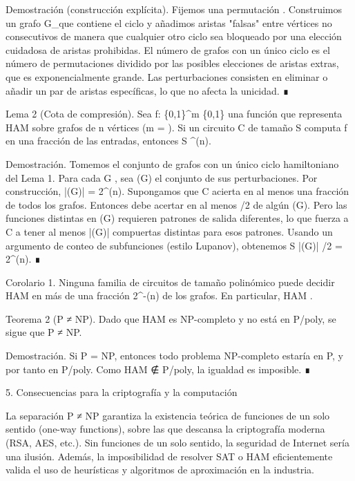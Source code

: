 \documentclass[12pt,a4paper]{book}
\begin{document}
Demostración (construcción explícita). Fijemos una permutación \sigma. Construimos un grafo G_\sigma que contiene el ciclo \sigma y añadimos aristas "falsas" entre vértices no consecutivos de manera que cualquier otro ciclo sea bloqueado por una elección cuidadosa de aristas prohibidas. El número de grafos con un único ciclo es el número de permutaciones dividido por las posibles elecciones de aristas extras, que es exponencialmente grande. Las perturbaciones consisten en eliminar o añadir un par de aristas específicas, lo que no afecta la unicidad. ∎

Lema 2 (Cota de compresión). Sea f: \{0,1\}^m \to \{0,1\} una función que representa HAM sobre grafos de n vértices (m = ). Si un circuito C de tamaño S computa f en una fracción \delta de las entradas, entonces S \ge \delta {}^{\Omega(n)}.

Demostración. Tomemos el conjunto  de grafos con un único ciclo hamiltoniano del Lema 1. Para cada G \in {}, sea (G) el conjunto de sus perturbaciones. Por construcción, |(G)| = 2^{\Omega(n)}. Supongamos que C acierta en al menos una fracción \delta de todos los grafos. Entonces debe acertar en al menos \delta/2 de algún (G). Pero las funciones distintas en (G) requieren patrones de salida diferentes, lo que fuerza a C a tener al menos |(G)| compuertas distintas para esos patrones. Usando un argumento de conteo de subfunciones (estilo Lupanov), obtenemos S \ge |(G)| \cdot \delta/2 = 2^{\Omega(n)}. ∎

Corolario 1. Ninguna familia de circuitos de tamaño polinómico puede decidir HAM en más de una fracción 2^{-\Omega(n)} de los grafos. En particular, HAM \notin {}.

Teorema 2 (P ≠ NP). Dado que HAM es NP-completo y no está en P/poly, se sigue que P ≠ NP.

Demostración. Si P = NP, entonces todo problema NP-completo estaría en P, y por tanto en P/poly. Como HAM ∉ P/poly, la igualdad es imposible. ∎

5. Consecuencias para la criptografía y la computación

La separación P ≠ NP garantiza la existencia teórica de funciones de un solo sentido (one-way functions), sobre las que descansa la criptografía moderna (RSA, AES, etc.). Sin funciones de un solo sentido, la seguridad de Internet sería una ilusión. Además, la imposibilidad de resolver SAT o HAM eficientemente valida el uso de heurísticas y algoritmos de aproximación en la industria.
\end{document}

